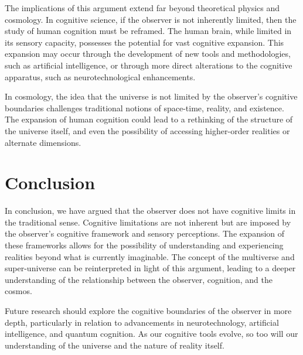 \documentclass[twocolumn]{article}
\begin{document}
    The implications of this argument extend far beyond theoretical physics and cosmology.
    In cognitive science, if the observer is not inherently limited, then the study of human cognition must be reframed.
    The human brain, while limited in its sensory capacity, possesses the potential for vast cognitive expansion.
    This expansion may occur through the development of new tools and methodologies, such as artificial intelligence,
    or through more direct alterations to the cognitive apparatus, such as neurotechnological enhancements.

    In cosmology, the idea that the universe is not limited by the observer's cognitive boundaries challenges
    traditional notions of space-time, reality, and existence.
    The expansion of human cognition could lead to a rethinking of the structure of the universe itself,
    and even the possibility of accessing higher-order realities or alternate dimensions.


    \section{Conclusion}
    \label{sec:conclusion}

    In conclusion, we have argued that the observer does not have cognitive limits in the traditional sense.
    Cognitive limitations are not inherent but are imposed by the observer's cognitive framework and sensory perceptions.
    The expansion of these frameworks allows for the possibility of understanding and experiencing realities
    beyond what is currently imaginable.
    The concept of the multiverse and super-universe can be reinterpreted in light of this argument,
    leading to a deeper understanding of the relationship between the observer, cognition, and the cosmos.

    Future research should explore the cognitive boundaries of the observer in more depth,
    particularly in relation to advancements in neurotechnology, artificial intelligence, and quantum cognition.
    As our cognitive tools evolve, so too will our understanding of the universe and the nature of reality itself.

    \lipsum[7-8]
\end{document}
